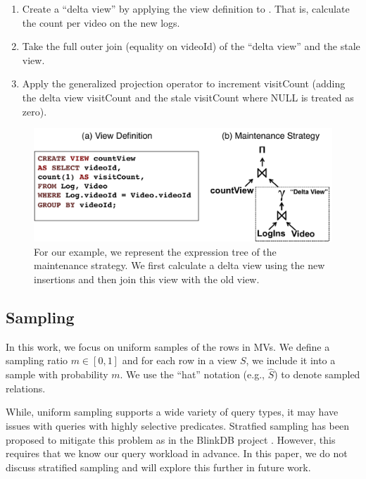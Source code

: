 \vspace{-.45em}
\begin{enumerate}
\itemsep0.1em
\item Create a ``delta view'' by applying the view definition to . That is, calculate the count per video on the new logs.
\item Take the full outer join (equality on \textsf{videoId}) of the ``delta view'' and the stale view.
\item Apply the generalized projection operator to increment \textsf{visitCount} (adding the delta view \textsf{visitCount}  and the stale \textsf{visitCount} where NULL is treated as zero).
\end{enumerate}
\vspace{-.5em}

\begin{figure}[t] \vspace{-2em}
\centering
 \includegraphics[scale=0.32]{figs/example_expression_tree.pdf} \vspace{-.5em}
 \caption{For our example, we represent the expression tree of the maintenance strategy. We first calculate a delta view using the new insertions and then join this view with the old view.\label{exexpr}}\vspace{-1.5em}
\end{figure}

\subsection{Sampling}
In this work, we focus on uniform samples of the rows in MVs.
We define a sampling ratio $m\in [0,1]$ and for each row in a view $S$, we include it into a sample with probability $m$.
We use the ``hat'' notation (e.g., $\hat{S}$) to denote sampled relations. 

While, uniform sampling supports a wide variety of query types, it may have issues with queries with highly selective predicates.
Stratfied sampling has been proposed to mitigate this problem as in the BlinkDB project \cite{AgarwalMPMMS13}.
However, this requires that we know our query workload in advance.  
In this paper, we do not discuss stratified sampling and will explore this further in future work.

